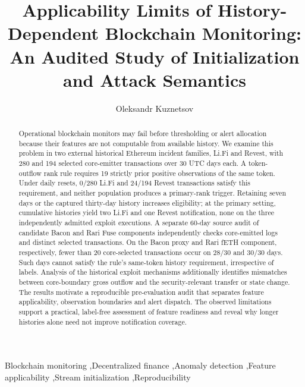 \documentclass[preprint,12pt,authoryear]{elsarticle}
\begin{document}
\begin{frontmatter}
\title{Applicability Limits of History-Dependent Blockchain Monitoring: An Audited Study of Initialization and Attack Semantics}
\author[aff1,aff2]{Oleksandr Kuznetsov}
\address[aff1]{Department of Theoretical and Applied Sciences, eCampus University, Italy}
\address[aff2]{Department of Intelligent Software Systems and Technologies, School of Computer Science and Artificial Intelligence, V. N. Karazin Kharkiv National University, Ukraine}
\begin{abstract}
Operational blockchain monitors may fail before thresholding or alert allocation because their features are not computable from available history. We examine this problem in two external historical Ethereum incident families, Li.Fi and Revest, with 280 and 194 selected core-emitter transactions over 30 UTC days each. A token-outflow rank rule requires 19 strictly prior positive observations of the same token. Under daily resets, 0/280 Li.Fi and 24/194 Revest transactions satisfy this requirement, and neither population produces a primary-rank trigger. Retaining seven days or the captured thirty-day history increases eligibility; at the primary setting, cumulative histories yield two Li.Fi and one Revest notification, none on the three independently admitted exploit executions. A separate 60-day source audit of candidate Bacon and Rari Fuse components independently checks core-emitted logs and distinct selected transactions. On the Bacon proxy and Rari fETH component, respectively, fewer than 20 core-selected transactions occur on 28/30 and 30/30 days. Such days cannot satisfy the rule's same-token history requirement, irrespective of labels. Analysis of the historical exploit mechanisms additionally identifies mismatches between core-boundary gross outflow and the security-relevant transfer or state change. The results motivate a reproducible pre-evaluation audit that separates feature applicability, observation boundaries and alert dispatch. The observed limitations support a practical, label-free assessment of feature readiness and reveal why longer histories alone need not improve notification coverage.
\end{abstract}
\begin{keyword}
Blockchain monitoring \sep Decentralized finance \sep Anomaly detection \sep Feature applicability \sep Stream initialization \sep Reproducibility
\end{keyword}
\end{frontmatter}
\end{document}
